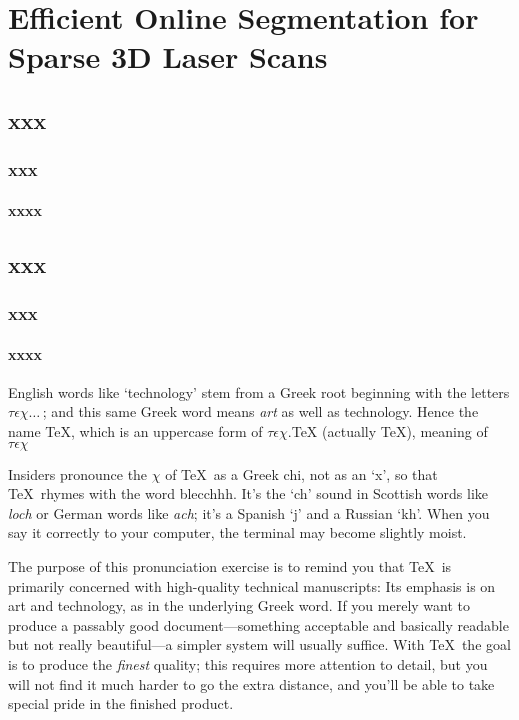 
\chapter{Efficient Online Segmentation for Sparse 3D Laser Scans}
\section{xxx}
\subsection{xxx}
\subsubsection{xxxx}
\section{xxx}
\subsection{xxx}
\subsubsection{xxxx}
English words like `technology' stem from a Greek root beginning with
the letters $\tau\epsilon\chi\ldots\,$; and this same Greek word means {\sl
art\/} as well as technology. Hence the name \TeX, which is an
uppercase form of $\tau\epsilon\chi$.{TeX (actually \TeX), meaning of}
$\tau\epsilon\chi$

Insiders pronounce the $\chi$ of \TeX\ as a Greek chi, not as an `x', so that
\TeX\ rhymes with the word blecchhh. It's the `ch' sound in Scottish words
like {\sl loch\/} or German words like {\sl ach\/}; it's a Spanish `j' and a
Russian `kh'. When you say it correctly to your computer, the terminal
may become slightly moist.

The purpose of this pronunciation exercise is to remind you that \TeX\ is
primarily concerned with high-quality technical manuscripts: Its emphasis is
on art and technology, as in the underlying Greek word. If you merely want
to produce a passably good document---something acceptable and basically
readable but not really beautiful---a simpler system will usually suffice.
With \TeX\ the goal is to produce the {\sl finest\/} quality; this requires
more attention to detail, but you will not find it much harder to go the
extra distance, and you'll be able to take special pride in the finished
product.

